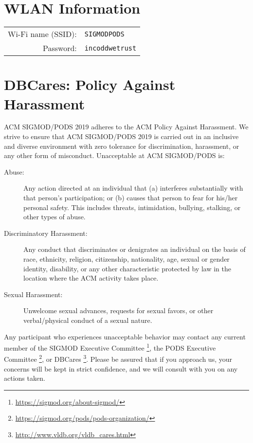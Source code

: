 
\cleardoublepage

\section{WLAN Information}

\begin{tabular}{rl}
Wi-Fi name (SSID): & \texttt{SIGMODPODS} \\
Password:          & \texttt{incoddwetrust}
\end{tabular}

\section{DBCares: Policy Against Harassment}

ACM SIGMOD/PODS 2019 adheres to the ACM Policy Against Harassment. We strive to ensure that ACM SIGMOD/PODS 2019 is carried out in an inclusive and diverse environment with zero tolerance for discrimination, harassment, or any other form of misconduct. 
Unacceptable at ACM SIGMOD/PODS is:
\begin{description}
\item[Abuse:] Any action directed at an individual that (a) interferes substantially with that person’s participation; or (b) causes that person to fear for his/her personal safety. This includes threats, intimidation, bullying, stalking, or other types of abuse.
\item[Discriminatory Harassment:] Any conduct that discriminates or denigrates an individual on the basis of race, ethnicity, religion, citizenship, nationality, age, sexual or gender identity, disability, or any other characteristic protected by law in the location where the ACM activity takes place.
\item[Sexual Harassment:] Unwelcome sexual advances, requests for sexual favors, or other verbal/physical conduct of a sexual nature.
\end{description}
Any participant who experiences unacceptable behavior may contact any current member of the SIGMOD Executive Committee%
\footnote{\url{https://sigmod.org/about-sigmod/}}, the PODS Executive Committee%
\footnote{\url{https://sigmod.org/pods/pods-organization/}}, or DBCares%
\footnote{\url{http://www.vldb.org/vldb_cares.html}}. Please be assured that if you approach us, your concerns will be kept in strict confidence, and we will consult with you on any actions taken.
